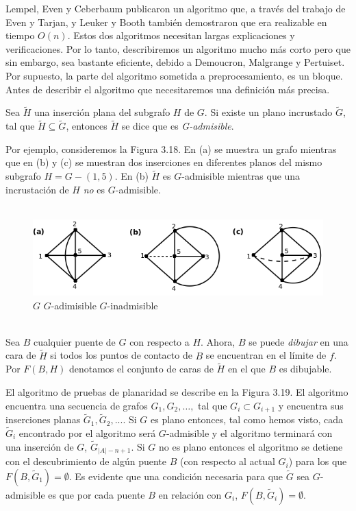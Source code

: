 \documentclass[10pt,a5paper]{book}
\begin{document}
Lempel, Even y Ceberbaum\cite{h} publicaron un algoritmo que, a través del trabajo de Even y Tarjan\cite{i}, y Leuker y Booth\cite{j} también demostraron que era realizable en tiempo $O(n)$. Estos dos algoritmos necesitan largas explicaciones y verificaciones. Por lo tanto, describiremos un algoritmo mucho más corto pero que sin embargo, sea bastante eficiente, debido a Demoucron, Malgrange y Pertuiset. Por supuesto, la parte del algoritmo sometida a preprocesamiento, es un bloque. Antes de describir el algoritmo que necesitaremos una definición más precisa.

Sea $\widetilde{H}$ una inserción plana del subgrafo $H$ de $G$. Si existe un plano incrustado $\widetilde{G}$, tal que $\widetilde{H} \subseteq \widetilde{G}$, entonces $\widetilde{H}$ se dice que es \emph{G-admisible}.

Por ejemplo, consideremos la Figura 3.18. En (a) se muestra un grafo mientras que en (b) y (c) se muestran dos inserciones en diferentes planos del mismo subgrafo $H = G - (1,5)$. En (b) $\widetilde{H}$ es $G$-admisible mientras que una incrustación de $H$ \emph{no} es $G$-admisible. 

\begin{figure}[H]
\caption{ }
\hrulefill{}\\
\hspace*{-.5in}\includegraphics[scale=.4]{Fig3_18.png}
\quad $G$ \qquad \qquad \qquad \qquad$G$-adimisible \qquad \qquad \qquad $G$-inadmisible
\end{figure}
\hrulefill{}\\

Sea $B$ cualquier puente de $G$ con respecto a $H$. Ahora, $B$ se puede \emph{dibujar} en una cara de $\widetilde{H}$ si todos los puntos de contacto de $B$ se encuentran en el límite de $f$. Por $F(B,H)$ denotamos el conjunto de caras de $\widetilde{H}$ en el que $B$ es dibujable.

El algoritmo de pruebas de planaridad se describe en la Figura 3.19. El algoritmo encuentra una secuencia de grafos $G_1, G_2, \ldots,$ tal que $G_i \subset G_{i+1}$ y encuentra sus inserciones planas $\widetilde{G}_1, \widetilde{G}_2, ...$. Si $G$ es plano entonces, tal como hemos visto, cada $\widetilde{G}_i$ encontrado por el algoritmo será $G$-admisible y el algoritmo terminará con una inserción de $G$, $\widetilde{G}_{|A| - n+1}$. Si $G$ no es plano entonces el algoritmo se detiene con el descubrimiento de algún puente $B$ (con respecto al actual $G_i$) para los que $F(B,\widetilde{G}_1) = \emptyset$. Es evidente que una condición necesaria para que $\widetilde{G}$ sea $G$-admisible es que por cada puente $B$ en relación con $G_i$, $F(B,\widetilde{G}_i) = \emptyset$.
\end{document}
